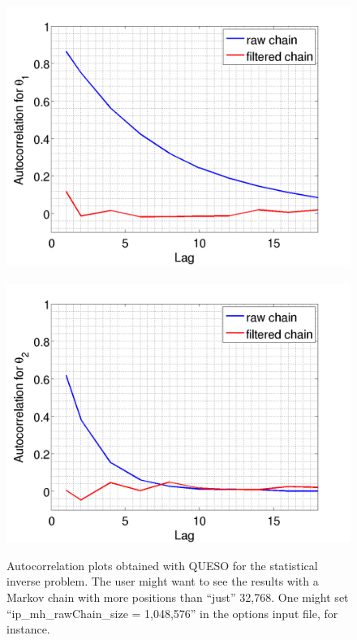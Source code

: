 \begin{figure}[h!]
\centerline{
\includegraphics[scale=0.30,clip=true,viewport=0.0in 0.0in 8.0in 7.0in]{figs/paper_plot1}
$~$
\includegraphics[scale=0.30,clip=true,viewport=0.0in 0.0in 8.0in 7.0in]{figs/paper_plot2}
}
\caption{
Autocorrelation plots obtained with QUESO for the statistical inverse problem.
The user might want to see the results with a Markov chain with more positions than ``just'' 32,768. One might set ``ip\_mh\_rawChain\_size = 1,048,576'' in the options input file, for instance.
}
\label{fig-sip-autocorr-plots}
\end{figure}


